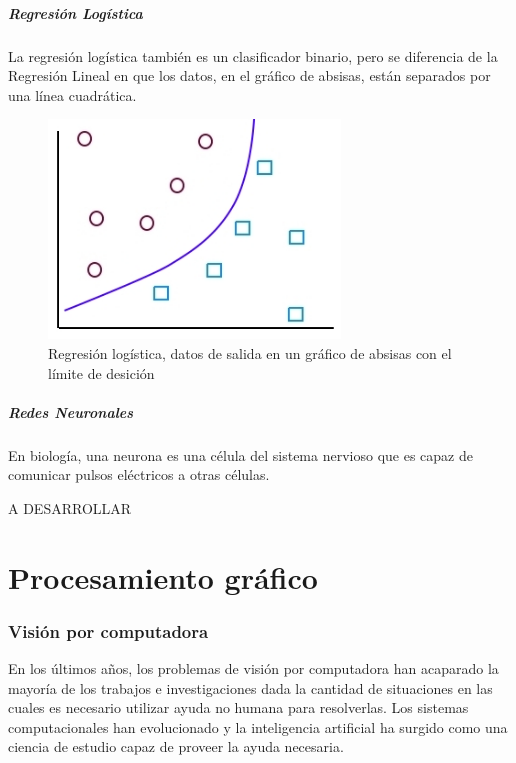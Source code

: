 \documentclass[a4paper,12pt,twoside]{article}
\begin{document}
\subsubsection{Regresión Logística}

La regresión logística también es un clasificador binario, pero se diferencia de la Regresión Lineal en que los datos, en el gráfico de absisas, están separados por una línea cuadrática. \par

\begin{figure}[h!]
	\includegraphics[width=220pt]{Imagenes/regresion2.jpg}
	\caption{Regresión logística, datos de salida en un gráfico de absisas con el límite de desición}
	\label{fig:regresion2}
\end{figure}


\subsubsection{Redes Neuronales}

En biología, una neurona es una célula del sistema nervioso que es capaz de comunicar pulsos eléctricos a otras células. \par


A DESARROLLAR


\newpage
\part{Procesamiento gráfico}

\section{Visión por computadora}
En los últimos años, los problemas de visión por computadora han acaparado la mayoría de los trabajos e investigaciones dada la cantidad de situaciones en las cuales es necesario utilizar ayuda no humana para resolverlas. Los sistemas computacionales han evolucionado y la inteligencia artificial ha surgido como una ciencia de estudio capaz de proveer la ayuda necesaria. \par
\end{document}
